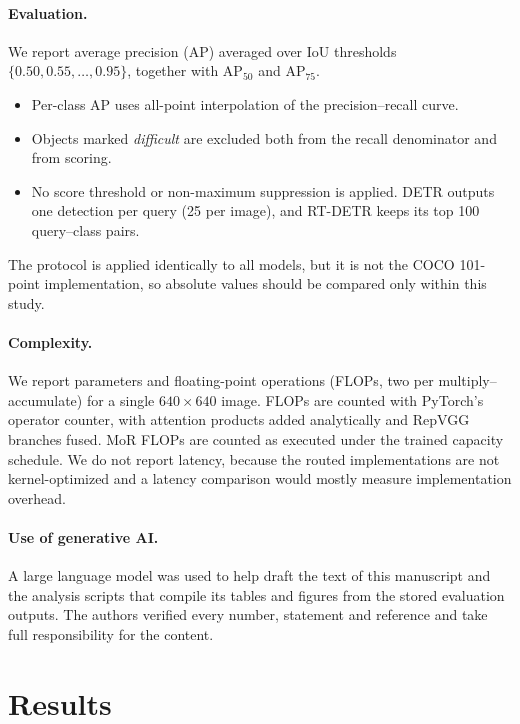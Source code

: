 \documentclass[pdflatex,iicol,sn-basic,Numbered]{sn-jnl}
\newcommand{\APfifty}{\ensuremath{\mathrm{AP}_{50}}}
\newcommand{\APseventyfive}{\ensuremath{\mathrm{AP}_{75}}}
\begin{document}
\paragraph{Evaluation.}
We report average precision (AP) averaged over IoU thresholds $\{0.50,0.55,\dots,0.95\}$, together with \APfifty{} and \APseventyfive{}.
\begin{itemize}
\item Per-class AP uses all-point interpolation of the precision--recall curve.
\item Objects marked \emph{difficult} are excluded both from the recall denominator and from scoring.
\item No score threshold or non-maximum suppression is applied. DETR outputs one detection per query (25 per image), and RT-DETR keeps its top 100 query--class pairs.
\end{itemize}
The protocol is applied identically to all models, but it is not the COCO 101-point implementation, so absolute values should be compared only within this study.

\paragraph{Complexity.}
We report parameters and floating-point operations (FLOPs, two per multiply--accumulate) for a single $640\times640$ image. FLOPs are counted with PyTorch's operator counter, with attention products added analytically and RepVGG branches fused. MoR FLOPs are counted as executed under the trained capacity schedule. We do not report latency, because the routed implementations are not kernel-optimized and a latency comparison would mostly measure implementation overhead.

\paragraph{Use of generative AI.}
A large language model was used to help draft the text of this manuscript and the analysis scripts that compile its tables and figures from the stored evaluation outputs. The authors verified every number, statement and reference and take full responsibility for the content.

\section{Results}\label{sec:results}
\end{document}
